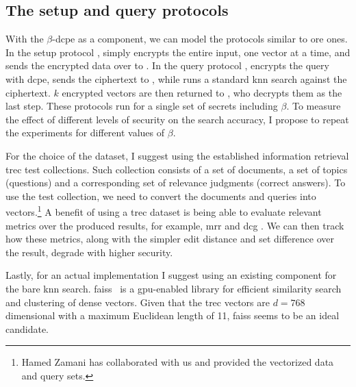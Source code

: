 		\subsection{The setup and query protocols}

			With the $\beta$-\acrshort{dcpe} as a component, we can model the protocols similar to \acrshort{ore} ones.
			In the setup protocol \protocolSetup{}, \user{} simply encrypts the entire input, one vector at a time, and sends the encrypted data over to \server{}.
			In the query protocol \protocolQuery{}, \user{} encrypts the query with \acrshort{dcpe}, sends the ciphertext to \server{}, while \server{} runs a standard \acrshort{knn} search against the ciphertext.
			$k$ encrypted vectors are then returned to \user{}, who decrypts them as the last step.
			These protocols run for a single set of secrets including $\beta$.
			To measure the effect of different levels of security on the search accuracy, I propose to repeat the experiments for different values of $\beta$.

			For the choice of the dataset, I suggest using the established information retrieval \acrshort{trec} test collections.
			Such collection consists of a set of documents, a set of topics (questions) and a corresponding set of relevance judgments (correct answers).
			To use the test collection, we need to convert the documents and queries into vectors.\footnote{
				Hamed Zamani has collaborated with us and provided the vectorized data and query sets.
			}
			A benefit of using a \acrshort{trec} dataset is being able to evaluate relevant metrics over the produced results, for example, \acrshort{mrr} \cite{mrr} and \acrshort{dcg} \cite{dcg}.
			We can then track how these metrics, along with the simpler edit distance and set difference over the result, degrade with higher security.

			Lastly, for an actual implementation I suggest using an existing component for the bare \acrshort{knn} search.
			\acrshort{faiss}~\cite{faiss} is a \acrshort{gpu}-enabled library for efficient similarity search and clustering of dense vectors.
			Given that the \acrshort{trec} vectors are $d = 768$ dimensional with a maximum Euclidean length of 11, \acrshort{faiss} seems to be an ideal candidate.
